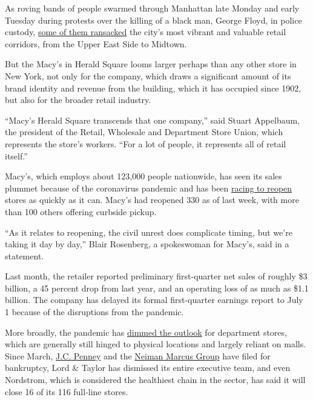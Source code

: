 As roving bands of people swarmed through Manhattan late Monday and
early Tuesday during protests over the killing of a black man, George
Floyd, in police custody,
\href{https://www.nytimes3xbfgragh.onion/2020/06/02/nyregion/nyc-looting-protests.html}{some
of them ransacked} the city's most vibrant and valuable retail
corridors, from the Upper East Side to Midtown.

But the Macy's in Herald Square looms larger perhaps than any other
store in New York, not only for the company, which draws a significant
amount of its brand identity and revenue from the building, which it has
occupied since 1902, but also for the broader retail industry.

``Macy's Herald Square transcends that one company,'' said Stuart
Appelbaum, the president of the Retail, Wholesale and Department Store
Union, which represents the store's workers. ``For a lot of people, it
represents all of retail itself.''

Macy's, which employs about 123,000 people nationwide, has seen its
sales plummet because of the coronavirus pandemic and has been
\href{https://www.nytimes3xbfgragh.onion/2020/04/30/business/macys-reopening-stores-coronavirus.html}{racing
to reopen} stores as quickly as it can. Macy's had reopened 330 as of
last week, with more than 100 others offering curbside pickup.

``As it relates to reopening, the civil unrest does complicate timing,
but we're taking it day by day,'' Blair Rosenberg, a spokeswoman for
Macy's, said in a statement.

Last month, the retailer reported preliminary first-quarter net sales of
roughly \$3 billion, a 45 percent drop from last year, and an operating
loss of as much as \$1.1 billion. The company has delayed its formal
first-quarter earnings report to July 1 because of the disruptions from
the pandemic.

More broadly, the pandemic has
\href{https://www.nytimes3xbfgragh.onion/2020/04/21/business/coronavirus-department-stores-neiman-marcus.html}{dimmed
the outlook} for department stores, which are generally still hinged to
physical locations and largely reliant on malls. Since March,
\href{https://www.nytimes3xbfgragh.onion/2020/05/15/business/jc-penney-bankruptcy-coronavirus.html}{J.C.
Penney} and the
\href{https://www.nytimes3xbfgragh.onion/2020/05/07/business/neiman-marcus-bankruptcy.html}{Neiman
Marcus Group} have filed for bankruptcy, Lord \& Taylor has dismissed
its entire executive team, and even Nordstrom, which is considered the
healthiest chain in the sector, has said it will close 16 of its 116
full-line stores.

